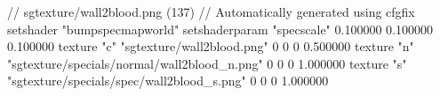 // sgtexture/wall2blood.png (137)
// Automatically generated using cfgfix
setshader "bumpspecmapworld"
setshaderparam "specscale" 0.100000 0.100000 0.100000
texture "c" "sgtexture/wall2blood.png" 0 0 0 0.500000
texture "n" "sgtexture/specials/normal/wall2blood_n.png" 0 0 0 1.000000
texture "s" "sgtexture/specials/spec/wall2blood_s.png" 0 0 0 1.000000

